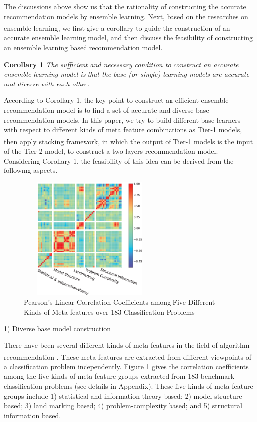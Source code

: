 \documentclass[review,3p,twocolumn,times]{elsarticle}
\newcommand{\upcite}[1]{\textsuperscript{\cite{#1}}}
\begin{document}
The discussions above show us that the rationality of constructing the accurate recommendation models by ensemble learning. Next, based on the researches on ensemble learning\upcite{dietterich2002ensemble, hansen1990neural}, we first give a corollary to guide the construction of an accurate ensemble learning model, and then discuss the feasibility of constructing an ensemble learning based recommendation model.

\textbf{Corollary 1} \emph{The sufficient and necessary condition to construct an accurate ensemble learning model is that the base (or single) learning models are accurate and diverse with each other.}

According to Corollary 1, the key point to construct an efficient ensemble recommendation model is to find a set of accurate and diverse base recommendation models. In this paper, we try to build different base learners with respect to different kinds of meta feature combinations as Tier-1 models, then apply stacking\upcite{Breiman1996Stacked} framework, in which the output of Tier-1 models is the input of the Tier-2 model, to construct a two-layers recommendation model. Considering Corollary 1, the feasibility of this idea can be derived from the following aspects.

\begin{figure}[!h]
	\small
	\centering
	\includegraphics[width=7cm, height=6cm]{correlation.eps}
	\caption{Pearson's Linear Correlation Coefficients among Five Different Kinds of Meta features
		over 183 Classification Problems}
	\label{fig:correlation}
\end{figure}

1) Diverse base model construction
\label{Diverse}

There have been several different kinds of meta features in the field of algorithm recommendation \upcite{Wang2014A}. These meta features are extracted from different viewpoints of a classification problem independently. Figure \ref{fig:correlation} gives the correlation coefficients among the five kinds of meta feature groups extracted from 183 benchmark classification problems (see details in Appendix). These five kinds of meta feature groups include 1) statistical and information-theory based; 2) model structure based; 3) land marking based; 4) problem-complexity based; and 5) structural information based. 
\end{document}
